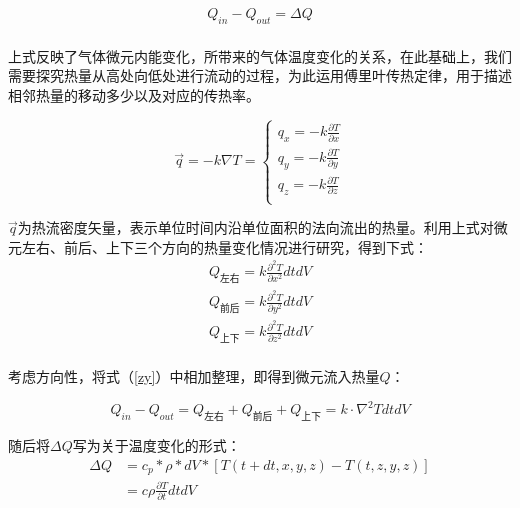 \documentclass{my_paper}
\begin{document}
\begin{equation}
    \begin{aligned}
        Q_{in} - Q_{out} = \Delta Q\\
\end{aligned}
\label{mianq}
\end{equation}

上式反映了气体微元内能变化，所带来的气体温度变化的关系，在此基础上，我们需要探究热量从高处向低处进行流动的过程，为此运用傅里叶传热定律\cite{2}，用于描述相邻热量的移动多少以及对应的传热率。

\begin{equation}
    \vec{q} = -k\nabla T =\begin{cases}
        q_x = -k \frac{\partial T}{\partial  x}\\
        q_y = -k \frac{\partial T}{\partial  y}\\
        q_z = -k \frac{\partial T}{\partial  z}\\
    \end{cases} 
\end{equation}

$ \vec{q} $为热流密度矢量，表示单位时间内沿单位面积的法向流出的热量。利用上式对微元左右、前后、上下三个方向的热量变化情况进行研究，得到下式：
\begin{equation}
    \begin{aligned}
        Q_{\text{左右}} = k\frac{\partial^2 T}{\partial x^2} dtdV\\
        Q_{\text{前后}} = k\frac{\partial^2 T}{\partial y^2} dtdV\\
        Q_{\text{上下}} = k\frac{\partial^2 T}{\partial z^2} dtdV\\
    \end{aligned}
    \label{zy}
\end{equation}

考虑方向性，将式（\ref{zy}）中相加整理，即得到微元流入热量$Q$：

\begin{equation}
    Q_{in}-Q_{out} = Q_{\text{左右}}+Q_{\text{前后}}+Q_{\text{上下}} = k\cdot \nabla^2 T dtdV
\end{equation}

随后将$\Delta Q$写为关于温度变化的形式：
\begin{equation}
    \begin{aligned}
        \Delta Q &= c_p * \rho * dV * [T(t+dt,x,y,z)-T(t,z,y,z)]\\
        &=c\rho \frac{\partial T}{\partial t}dtdV
    \end{aligned}
    \label{23}
\end{equation}
\end{document}
